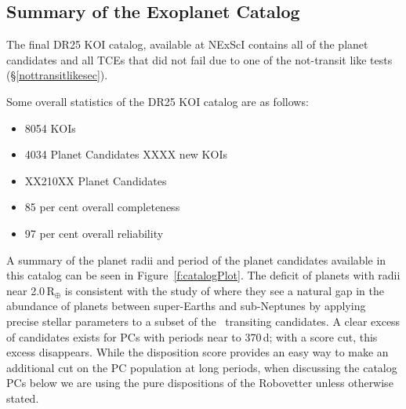 \subsection{Summary of the Exoplanet Catalog}

The final DR25 KOI catalog, available at NExScI contains all of the planet candidates and all TCEs that did not fail due to one of the not-transit like tests (\S\ref{nottransitlikesec}). 


Some overall statistics of the DR25 KOI catalog are as follows:
\begin{itemize}
    \item 8054 KOIs
    \item 4034 Planet Candidates
    \itme XXXX new KOIs
    \item XX210XX Planet Candidates
    \item 85 per cent overall completeness
    \item 97 per cent overall reliability
\end{itemize}


A summary of the planet radii and period of the planet candidates available in this catalog can be seen in Figure~\ref{f:catalogPlot}. The deficit of planets with radii near 2.0\,R$_{\oplus}$ is consistent with the study of \citet{Fulton2017} where they see a natural gap in the abundance of planets between super-Earths and sub-Neptunes by applying precise stellar parameters to a subset of the \kepler\ transiting candidates. A clear excess of candidates exists for PCs with periods near to 370\,d;  with a score cut, this excess disappears. While the disposition score provides an easy way to make an additional cut on the PC population at long periods, when discussing the catalog PCs below we are using the pure dispositions of the Robovetter unless otherwise stated. 


